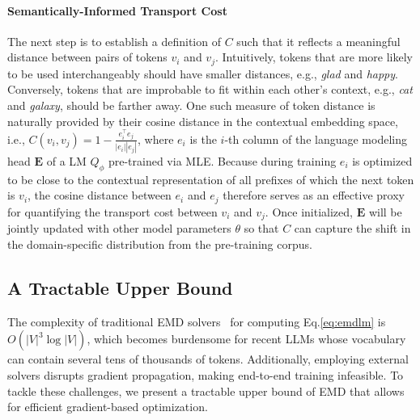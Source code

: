\paragraph{Semantically-Informed Transport Cost} The next step is to establish a definition of $C$ such that it reflects a meaningful distance between pairs of tokens $v_i$ and $v_j$. Intuitively, tokens that are more likely to be used interchangeably should have smaller distances, e.g., \textit{glad} and \textit{happy}. Conversely, tokens that are improbable to fit within each other's context, e.g., \textit{cat} and \textit{galaxy}, should be farther away. One
such measure of token distance is naturally provided by their cosine distance in the contextual embedding space, i.e., $C(v_i, v_j)=1-\frac{e_i^{\top}e_j}{|e_i||e_j|}$, where $e_i$ is the $i$-th column of the language modeling head $\bm{E}$ of a LM $Q_{\phi}$ pre-trained via MLE. Because during training $e_i$ is optimized to be close to the contextual representation of all prefixes of which the next token is $v_i$, the cosine distance between $e_i$ and $e_j$ therefore serves as an effective proxy for quantifying the transport cost between $v_i$ and $v_j$. Once initialized, $\bm{E}$ will be jointly updated with other model parameters $\theta$ so that $C$ can capture the shift in the domain-specific distribution from the pre-training corpus.

\subsection{A Tractable Upper Bound}
The complexity of traditional EMD solvers~\citep{treeemd,n3logn} for computing Eq.\ref{eq:emdlm} is $O(|V|^3\log|V|)$, which becomes burdensome for recent LLMs whose vocabulary can contain several tens of thousands of tokens. Additionally, employing external solvers disrupts gradient propagation, making end-to-end training infeasible. To tackle these challenges, we present a tractable 
upper bound of EMD that allows for efficient gradient-based optimization.

